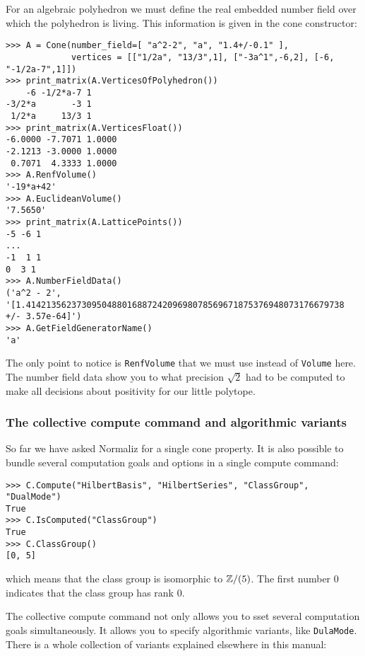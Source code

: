 \begin{small}
For an algebraic polyhedron we must define the real embedded number field over which the polyhedron is living. This information is given in the cone constructor:
\begin{Verbatim}
>>> A = Cone(number_field=[ "a^2-2", "a", "1.4+/-0.1" ], 
             vertices = [["1/2a", "13/3",1], ["-3a^1",-6,2], [-6, "-1/2a-7",1]])
>>> print_matrix(A.VerticesOfPolyhedron())
    -6 -1/2*a-7 1
-3/2*a       -3 1
 1/2*a     13/3 1
>>> print_matrix(A.VerticesFloat())
-6.0000 -7.7071 1.0000
-2.1213 -3.0000 1.0000
 0.7071  4.3333 1.0000
>>> A.RenfVolume()
'-19*a+42'
>>> A.EuclideanVolume()
'7.5650'
>>> print_matrix(A.LatticePoints())
-5 -6 1
...
-1  1 1
0  3 1
>>> A.NumberFieldData()
('a^2 - 2', '[1.414213562373095048801688724209698078569671875376948073176679738 +/- 3.57e-64]')
>>> A.GetFieldGeneratorName()
'a'
\end{Verbatim}

The only point to notice is \verb|RenfVolume| that we must use instead of \verb|Volume| here. The number field data show you to what precision $\sqrt2$ had to be computed to make all decisions about positivity for our little polytope.

\subsubsection{The collective compute command and algorithmic variants}
So far we have asked Normaliz for a single cone property. It is also possible to bundle several computation goals and options in a single compute command:
\begin{Verbatim}
>>> C.Compute("HilbertBasis", "HilbertSeries", "ClassGroup", "DualMode")
True
>>> C.IsComputed("ClassGroup")
True
>>> C.ClassGroup()
[0, 5]
\end{Verbatim}
which means that the class group is isomorphic to ${\mathbb Z}/(5)$. The first number $0$ indicates that the class group has rank $0$.

The collective compute command not only allows you to sset several computation goals simultaneously. It allows you to specify algorithmic variants, like \verb|DulaMode|. There is a whole collection of variants explained elsewhere in this manual:



\end{small}
